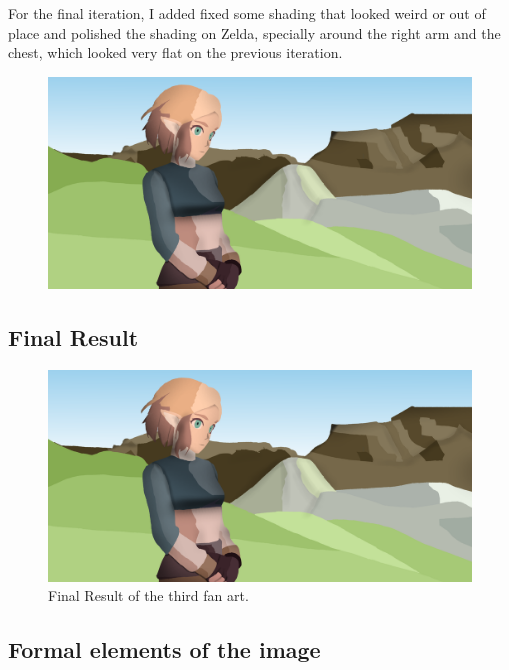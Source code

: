 \documentclass{cup-pan}
\begin{document}
        For the final iteration, I added fixed some shading that looked weird or out of place and polished the shading on Zelda, specially around the right arm and the chest, which looked very flat on the previous iteration. 
        \begin{figure}[H]
            \includegraphics[width=\textwidth]{Fanart3/3_Color/IIIII_Color.png}
        \end{figure}

    \subsection{Final Result}

        \begin{figure}[H]
            \includegraphics[width=\textwidth]{Fanart3/3_Color/IIIII_Color.png}
             \caption{Final Result of the third fan art.}
         \end{figure}

    \subsection{Formal elements of the image}
\end{document}

